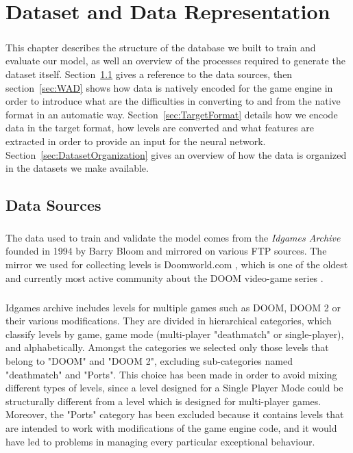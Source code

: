 \chapter{Dataset and Data Representation}
\label{ch:dataset}
\paragraph{}
This chapter describes the structure of the database we built to train and evaluate our model, as well an overview of the processes required to generate the dataset itself.
Section~\ref{sec:Sources} gives a reference to the data sources, then section~\ref{sec:WAD} shows how data is natively encoded for the game engine in order to introduce what are the difficulties in converting to and from the native format in an automatic way. Section~\ref{sec:TargetFormat} details how we encode data in the target format, how levels are converted  and what features are extracted in order to provide an input for the neural network. Section~\ref{sec:DatasetOrganization} gives an overview of how the data is organized in the datasets we make available.
 
\section{Data Sources}
\label{sec:Sources}
\paragraph{} The data used to train and validate the model comes from the \textit{Idgames Archive} founded in 1994 by Barry Bloom \cite{idarchivehistory} and mirrored on various FTP sources. The mirror we used for collecting levels is Doomworld.com \cite{url:doomworld}, which is one of the oldest and currently most active community about the DOOM video-game series \cite{wiki:doomworld}.
\paragraph{} Idgames archive includes levels for multiple games such as DOOM, DOOM 2 or their various modifications. They are divided in hierarchical categories, which classify levels by game, game mode (multi-player "deathmatch" or single-player), and alphabetically.
Amongst the categories we selected only those levels that belong to "DOOM" and "DOOM 2", excluding sub-categories named "deathmatch" and "Ports". This choice has been made in order to avoid mixing different types of levels, since a level designed for a Single Player Mode could be structurally different from a level which is designed for multi-player games. Moreover, the "Ports" category has been excluded because it contains levels that are intended to work with modifications of the game engine code, and it would have led to problems in managing every particular exceptional behaviour.

